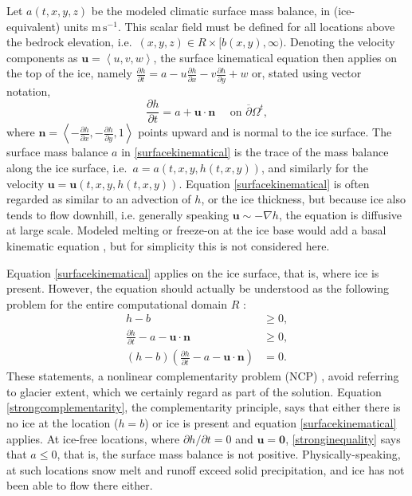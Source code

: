 \documentclass[letterpaper,final,12pt,reqno]{amsart}
\newcommand{\grad}{\nabla}
\newcommand{\bn}{\mathbf{n}}
\newcommand{\bu}{\mathbf{u}}
\newcommand{\bzero}{\bm{0}}
\begin{document}
Let $a(t,x,y,z)$ be the modeled climatic surface mass balance, in (ice-equivalent) units $\text{m}\,\text{s}^{-1}$.  This scalar field must be defined for all locations above the bedrock elevation, i.e.~$(x,y,z) \in R\times[b(x,y),\infty)$.  Denoting the velocity components as $\bu=\left<u,v,w\right>$, the surface kinematical equation \cite{GreveBlatter2009} then applies on the top of the ice, namely $\frac{\partial h}{\partial t} = a - u \frac{\partial h}{\partial x} - v \frac{\partial h}{\partial y} + w$ or, stated using vector notation,
\begin{equation}
\frac{\partial h}{\partial t} = a + \bu \cdot \bn \quad \text{ on } \overline{\partial}\Omega^t, \label{surfacekinematical}
\end{equation}
where $\bn = \left<-\frac{\partial h}{\partial x},-\frac{\partial h}{\partial y},1\right>$ points upward and is normal to the ice surface.  The surface mass balance $a$ in \eqref{surfacekinematical} is the trace \cite{Evans2010} of the mass balance along the ice surface, i.e.~$a = a(t,x,y,h(t,x,y))$, and similarly for the velocity $\bu = \bu(t,x,y,h(t,x,y))$.  Equation \eqref{surfacekinematical} is often regarded as similar to an advection of $h$, or the ice thickness, but because ice also tends to flow downhill, i.e. generally speaking $\bu \sim -\grad h$, the equation is diffusive at large scale.  Modeled melting or freeze-on at the ice base would add a basal kinematic equation \cite[for example]{Aschwandenetal2012}, but for simplicity this is not considered here.

Equation \eqref{surfacekinematical} applies on the ice surface, that is, where ice is present.  However, the equation should actually be understood as the following problem for the entire computational domain $R$ \cite{SchoofHewitt2013}:
\begin{align}
h-b &\ge 0, \label{strongadmissibility} \\
\frac{\partial h}{\partial t} - a - \bu \cdot \bn &\ge 0, \label{stronginequality} \\
(h-b) \left(\frac{\partial h}{\partial t} - a - \bu \cdot \bn\right) &= 0. \label{strongcomplementarity}
\end{align}
These statements, a nonlinear complementarity problem (NCP) \cite{Bueler2016,Bueler2020,Calvoetal2002}, avoid referring to glacier extent, which we certainly regard as part of the solution.  Equation \eqref{strongcomplementarity}, the complementarity principle, says that either there is no ice at the location ($h=b$) or ice is present and equation \eqref{surfacekinematical} applies.  At ice-free locations, where $\partial h/\partial t=0$ and $\bu=\bzero$, \eqref{stronginequality} says that $a \le 0$, that is, the surface mass balance is not positive.  Physically-speaking, at such locations snow melt and runoff exceed solid precipitation, and ice has not been able to flow there either.
\end{document}
